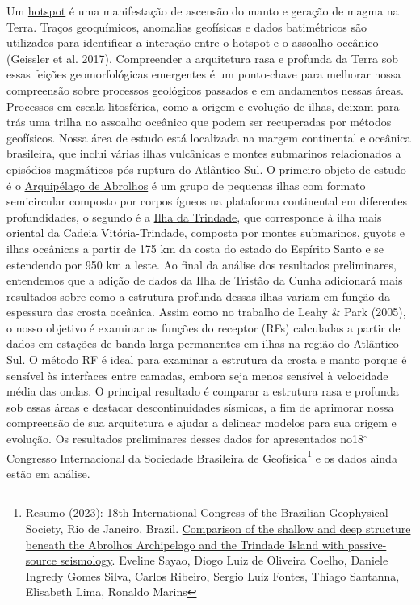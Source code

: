 \documentclass[10pt,a4paper,oneside]{book}
\begin{document}
Um \href{https://pt.wikipedia.org/wiki/Ponto_quente\#Refer\%C3\%AAncias}{hotspot} é uma manifestação de ascensão do manto e geração de magma na Terra. Traços geoquímicos, anomalias geofísicas e dados batimétricos são utilizados para identificar a interação entre o hotspot e o assoalho oceânico (Geissler et al. 2017). Compreender a arquitetura rasa e profunda da Terra sob essas feições geomorfológicas emergentes é um ponto-chave para melhorar nossa compreensão sobre processos geológicos passados e em andamentos nessas áreas. Processos em escala litosférica, como a origem e evolução de ilhas, deixam para trás uma trilha no assoalho oceânico que podem ser recuperadas por métodos geofísicos. Nossa área de estudo está localizada na margem continental e oceânica brasileira, que inclui várias ilhas vulcânicas e montes submarinos relacionados a episódios magmáticos pós-ruptura do Atlântico Sul. O primeiro objeto de estudo é o \href{https://pt.wikipedia.org/wiki/Abrolhos}{Arquipélago de Abrolhos} é um grupo de pequenas ilhas com formato semicircular composto por corpos ígneos na plataforma continental em diferentes profundidades, o segundo é a \href{https://pt.wikipedia.org/wiki/Trindade_e_Martim_Vaz}{Ilha da Trindade}, que corresponde à ilha mais oriental da Cadeia Vitória-Trindade, composta por montes submarinos, guyots e ilhas oceânicas a partir de 175 km da costa do estado do Espírito Santo e se estendendo por 950 km a leste. Ao final da análise dos resultados preliminares, entendemos que a adição de dados da \href{https://pt.wikipedia.org/wiki/Trist\%C3\%A3o_da_Cunha_(arquip\%C3\%A9lago)}{Ilha de Tristão da Cunha} adicionará mais resultados sobre como a estrutura profunda dessas ilhas variam em função da espessura das crosta oceânica. Assim como no trabalho de Leahy \& Park (2005), o nosso objetivo é examinar as funções do receptor (RFs) calculadas a partir de dados em estações de banda larga permanentes em ilhas na região do Atlântico Sul. O método RF é ideal para examinar a estrutura da crosta e manto porque é sensível às interfaces entre camadas, embora seja menos sensível à velocidade média das ondas. O principal resultado é comparar a estrutura rasa e profunda sob essas áreas e destacar descontinuidades sísmicas, a fim de aprimorar nossa compreensão de sua arquitetura e ajudar a delinear modelos para sua origem e evolução. Os resultados preliminares desses dados for apresentados no18$^\circ$ Congresso Internacional da Sociedade Brasileira de Geofísica\footnote{Resumo (2023): 18th International Congress of the Brazilian Geophysical Society, Rio de Janeiro, Brazil. \href{https://sbgf.org.br/mysbgf/eventos/expanded_abstracts/18th_CISBGf/57aeee35c98205091e18d1140e9f38cfShort_Abstract_18th_CISBGf_.docx}{Comparison of the shallow and deep structure beneath the Abrolhos Archipelago and the Trindade Island with passive-source seismology}. Eveline Sayao, Diogo Luiz de Oliveira Coelho, Daniele Ingredy Gomes Silva, Carlos Ribeiro, Sergio Luiz Fontes, Thiago Santanna, Elisabeth Lima, Ronaldo Marins} e os dados ainda estão em análise.
\end{document}
